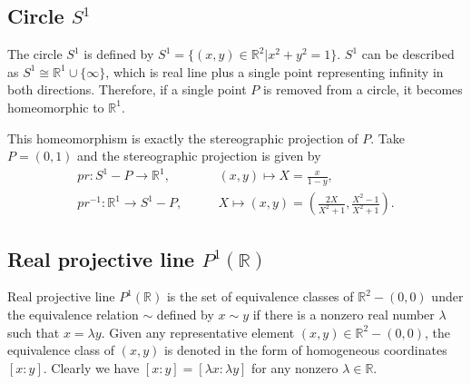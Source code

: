 \documentclass{report}
\begin{document}
\subsection{Circle $S^1$}
The circle $S^1$ is defined by $S^1=\{(x,y)\in\mathbb{R}^2|x^2+y^2=1\}$. $S^1$ can be described as $S^1\cong \mathbb{R}^1\cup\{\infty\}$, which is real line plus a single point representing infinity in both directions. Therefore, if a single point $P$ is removed from a circle, it becomes homeomorphic to $\mathbb{R}^1$.
\begin{center}
\end{center}
This homeomorphism is exactly the stereographic projection of $P$. Take $P=(0,1)$ and the stereographic projection is given by
\begin{align*}
	pr:S^1-P\longrightarrow \mathbb{R}^1,\qquad      & (x, y) \longmapsto X=\frac{x}{1-y},                                           \\
	pr^{-1}:\mathbb{R}^1\longrightarrow S^1-P,\qquad & X \longmapsto(x, y)=\left(\frac{2X}{X^{2}+1}, \frac{X^{2}-1}{X^{2}+1}\right).
\end{align*}

\subsection{Real projective line $P^1(\mathbb{R})$}
Real projective line $P^1(\mathbb{R})$ is the set of equivalence classes of $\mathbb{R}^2-{(0,0)}$ under the equivalence relation $\sim$ defined by $x\sim y$ if there is a nonzero real number $\lambda$ such that $x = \lambda y$. Given any representative element $(x,y)\in \mathbb{R}^2-{(0,0)}$, the equivalence class of $(x,y)$ is denoted in the form of homogeneous coordinates $[x:y]$. Clearly we have $[x:y]=[\lambda x:\lambda y]$ for any nonzero $\lambda\in \mathbb{R}$.
\end{document}
